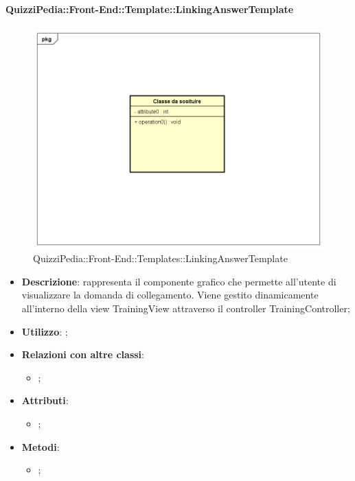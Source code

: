 		\paragraph{QuizziPedia::Front-End::Template::LinkingAnswerTemplate}
		
				\label{QuizziPedia::Front-End::Templates::LinkingAnswerTemplate}

				\begin{figure}[h]
					\centering
					\includegraphics[scale=0.5,keepaspectratio]{UML/Classi/Front-End/Temporanea.png}
					\caption{QuizziPedia::Front-End::Templates::LinkingAnswerTemplate}
				\end{figure}		
		
			\begin{itemize}
				\item \textbf{Descrizione}: rappresenta il componente grafico che permette all'utente di visualizzare la domanda di collegamento. Viene gestito dinamicamente all'interno della view TrainingView attraverso il controller TrainingController;
				\item \textbf{Utilizzo}: ;
				\item \textbf{Relazioni con altre classi}: 
				\begin{itemize}
					\item ;
				\end{itemize}
				\item \textbf{Attributi}: 
				\begin{itemize}
					\item ;
				\end{itemize}
				\item \textbf{Metodi}: 
				\begin{itemize}
					\item ;
				\end{itemize}
			\end{itemize}
		
